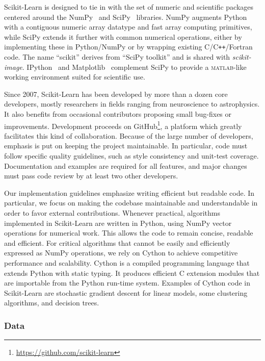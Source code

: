 Scikit-Learn is designed to tie in with the set of numeric and scientific
packages centered around the NumPy~\citep{oliphant:2007} and
SciPy~\citep{vanderwalt:2011} libraries. NumPy augments Python with a
contiguous numeric array datatype and fast array computing primitives, while
SciPy extends it further with common numerical operations, either by
implementing these in Python/NumPy or by wrapping existing
C/C{}\verb!++!/Fortran code. The name ``scikit'' derives from ``SciPy toolkit''
and is shared with \textit{scikit-image}. IPython~\citep{perez:2007} and
Matplotlib~\citep{hunter:2007} complement SciPy to provide a
\textsc{matlab}-like working environment suited for scientific use.

Since 2007, Scikit-Learn has been developed by more than a dozen core
developers, mostly researchers in fields ranging from neuro\-science to
astro\-physics. It also benefits from occasional contributors proposing small
bug-fixes or improvements. Development proceeds on
GitHub\footnote{\url{https://github.com/scikit-learn}}, a platform which
greatly facilitates this kind of collaboration. Because of the large number of
developers, emphasis is put on keeping the project maintainable. In particular,
code must follow specific quality guidelines, such as style consistency and
unit-test coverage. Documentation and examples are required for all features,
and major changes must pass code review by at least two other developers.

Our implementation guidelines emphasize writing efficient but readable code. In
particular, we focus on making the codebase maintainable and understandable in
order to favor external contributions. Whenever practical, algorithms
implemented in Scikit-Learn are written in Python, using NumPy vector
operations for numerical work. This allows the code to remain concise, readable
and efficient. For critical algorithms that cannot be easily and efficiently
expressed as NumPy operations, we rely on Cython \citep{behnel:2011} to achieve
competitive performance and scalability. Cython is a compiled programming
language that extends Python with static typing. It produces efficient C
extension modules that are importable from the Python run-time system. Examples
of Cython code in Scikit-Learn are stochastic gradient descent for linear
models, some clustering algorithms, and decision trees.

\subsubsection{Data}

